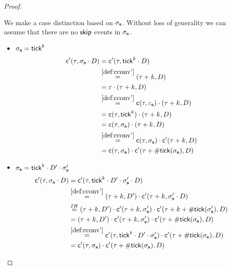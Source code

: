 \begin{proof}
\begin{itemize}
        We make a case distinction based on $\sigma_{\mathbf{s}}$.
        Without loss of generality we can assume that there
        are no $\mathsf{skip}$ events in $\sigma_{\mathbf{s}}$.
        \begin{itemize}
            \item $\sigma_{\mathbf{s}} = \mathsf{tick}^k$
            \begin{align*}
                \mathsf{c}'(\tau, \sigma_{\mathbf{s}} \cdot D)
                &= \mathsf{c}'(\tau, \mathsf{tick}^k \cdot D) \\
                &\stackrel{\ref{def:cconv'}}{=}
                    (\tau + k, D) \\
                &= \varepsilon \cdot
                    (\tau + k, D) \\
                &\stackrel{\ref{def:cconv'}}{=}
                    \mathsf{c}(\tau, \varepsilon_{\mathbf{s}}) \cdot
                    (\tau + k, D) \\
                &= \mathsf{c}(\tau, \mathsf{tick}^k) \cdot
                    (\tau + k, D) \\
                &= \mathsf{c}(\tau, \sigma_{\mathbf{s}}) \cdot
                    (\tau + k, D) \\
                &\stackrel{\ref{def:cconv'}}{=}
                    \mathsf{c}(\tau, \sigma_{\mathbf{s}}) \cdot
                    \mathsf{c}'(\tau+k, D) \\
                &= \mathsf{c}(\tau, \sigma_{\mathbf{s}}) \cdot
                    \mathsf{c}'(\tau+ \mathsf{\#tick}(\sigma_{\mathbf{s}}), D)
            \end{align*}
            \item $\sigma_{\mathbf{s}} = \mathsf{tick}^k \cdot D' \cdot \sigma_{\mathbf{s}}'$
            \begin{align*}
                \mathsf{c}'(\tau, \sigma_{\mathbf{s}} \cdot D)
                &= \mathsf{c}'(\tau, \mathsf{tick}^k \cdot D' \cdot \sigma_{\mathbf{s}}' \cdot D) \\
                &\stackrel{\ref{def:cconv'}}{=}
                    (\tau+k, D') \cdot
                    \mathsf{c}'(\tau+k, \sigma_{\mathbf{s}}' \cdot D) \\
                &\stackrel{IH}{=}
                    (\tau+k, D') \cdot
                    \mathsf{c}'(\tau+k, \sigma_{\mathbf{s}}') \cdot
                    \mathsf{c}'(\tau+k+\mathsf{\#tick}(\sigma_{\mathbf{s}}'), D) \\
                &= (\tau+k, D') \cdot
                    \mathsf{c}'(\tau+k, \sigma_{\mathbf{s}}') \cdot
                    \mathsf{c}'(\tau+\mathsf{\#tick}(\sigma_{\mathbf{s}}), D) \\
                &\stackrel{\ref{def:cconv'}}{=}
                    \mathsf{c}'(\tau, \mathsf{tick}^k \cdot D' \cdot \sigma_{\mathbf{s}}') \cdot
                    \mathsf{c}'(\tau+\mathsf{\#tick}(\sigma_{\mathbf{s}}), D) \\
                &= \mathsf{c}'(\tau, \sigma_{\mathbf{s}}) \cdot
                    \mathsf{c}'(\tau+\mathsf{\#tick}(\sigma_{\mathbf{s}}), D)
            \end{align*}
        \end{itemize}
        
    \end{itemize}
\end{proof}

